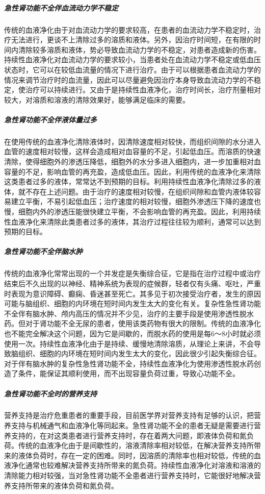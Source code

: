 \subparagraph{急性肾功能不全伴血流动力学不稳定}

传统的血液净化由于对血流动力学的要求较高，在患者的血流动力学不稳定时，治疗无法进行，更谈不上清除过多的溶质和液体。另外，因治疗时间短，在有限的时间内清除较多溶质和液体，势必导致血流动力学的不稳定，对患者造成新的伤害。持续性血液净化对血流动力学的要求较小，当患者处在血流动力学不稳定或低血压状态时，它可以在较低血流量的情况下进行治疗。由于可以根据患者血流动力学的情况来调节治疗时的血流量，因此可以尽量避免因治疗本身导致血流动力学的不稳定，使治疗可以持续进行。又由于是持续性血液净化，治疗时间长，治疗剂量相对较大，对溶质和溶液的清除效果好，能够满足临床的需要。

\subparagraph{急性肾功能不全伴液体量过多}

在使用传统的血液净化清除液体时，因清除速度相对较快，而组织间隙的水分进入血管的速度相对较慢，这样会造成相对血容量的不足，引起低血压。而溶质的快速清除，使得细胞外的渗透压降低，细胞外的水分多进入细胞内，进一步加重相对血容量的不足，影响血管的再充盈，造成低血压。因此，利用传统的血液净化来清除这类患者过多的液体，常常达不到预期的目标。利用持续性血液净化清除过多的液体，就不存在上述问题。由于治疗的速度相对较慢，在组织间隙和血管内液体较容易建立平衡，不易引起低血压；治疗速度的相对较慢，细胞外渗透压下降的速度也慢，细胞内外的渗透压能很快建立平衡，不会影响血管的再充盈。因此，利用持续性血液净化来清除此类患者过多的液体，其治疗过程往往较为顺利，通常可以达到预期的目标。

\subparagraph{急性肾功能不全伴脑水肿}

传统的血液净化常常出现的一个并发症是失衡综合征，它是指在治疗过程中或治疗结束后不久出现的以神经、精神系统为表现的症候群，轻者仅有头痛、呕吐，严重时表现为意识障碍、癫痫、昏迷甚至死亡。其多见于初次接受治疗者，发生的原因可能与脑组织、细胞的内环境在短时间内发生太大的变化有关。复杂性急性肾功能不全伴有脑水肿、颅内高压的情况并不少见，治疗的主要手段是使用渗透性脱水药。但对于肾功能不全无尿的患者，使用该类药物有很大的限制。传统的血液净化也不能完全解决这个问题，因为它是间歇的，而脱水药的使用是每6～8小时就必须使用一次。持续性血液净化由于是持续、缓慢地清除溶质，从理论上来讲，不会导致脑组织、细胞的内环境在短时间内发生太大的变化，因此很少引起失衡综合征。对于伴有脑水肿的复杂性急性肾功能不全，持续性血液净化为使用渗透性脱水药创造了条件，能保证其顺利使用，而不出现容量负荷过重，导致心功能不全。

\subparagraph{急性肾功能不全时的营养支持}

营养支持是治疗危重患者的重要手段，目前医学界对营养支持有足够的认识，把营养支持与机械通气和血液净化等同起来。急性肾功能不全的患者无疑是需要进行营养支持的，在对这类患者进行营养支持时，存在着两大问题，即液体负荷和氮负荷。传统的血液净化由于是间歇性的，溶液清除率相对较低，在解决营养支持所带来的液体负荷时，存在一定的困难。同时，因溶质的清除率也相对较低，传统的血液净化通常也较难解决营养支持所带来的氮负荷。持续性血液净化对溶液和溶液的清除能力相对较强，当对急性肾功能不全患者进行营养支持时，它能很好地解决营养支持所带来的液体负荷和氮负荷。


